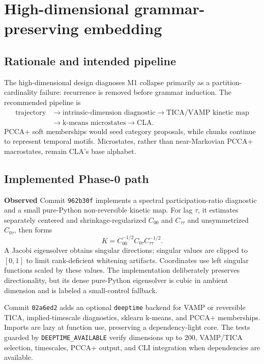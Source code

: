 \documentclass[11pt]{article}
\newcommand{\Observed}{\textbf{Observed}}
\begin{document}
\section{High-dimensional grammar-preserving embedding}
\subsection{Rationale and intended pipeline}
The high-dimensional design diagnoses M1 collapse primarily as a partition-cardinality failure: recurrence is removed before grammar induction. The recommended pipeline is
\begin{align*}
\text{trajectory} &\rightarrow \text{intrinsic-dimension diagnostic}
\rightarrow \text{TICA/VAMP kinetic map} \\
&\rightarrow \text{k-means microstates}\rightarrow\text{CLA}.
\end{align*}
PCCA+ soft memberships would seed category proposals, while chunks continue to represent temporal motifs. Microstates, rather than near-Markovian PCCA+ macrostates, remain CLA's base alphabet.

\subsection{Implemented Phase-0 path}
\Observed{} Commit \texttt{962b30f} implements a spectral participation-ratio diagnostic and a small pure-Python non-reversible kinetic map. For lag $\tau$, it estimates separately centered and shrinkage-regularized $C_{00}$ and $C_{\tau\tau}$ and unsymmetrized $C_{0\tau}$, then forms
\begin{equation}
K=C_{00}^{-1/2}C_{0\tau}C_{\tau\tau}^{-1/2}.
\end{equation}
A Jacobi eigensolver obtains singular directions; singular values are clipped to $[0,1]$ to limit rank-deficient whitening artifacts. Coordinates use left singular functions scaled by these values. The implementation deliberately preserves directionality, but its dense pure-Python eigensolver is cubic in ambient dimension and is labeled a small-control fallback.

Commit \texttt{02a6ed2} adds an optional \texttt{deeptime} backend for VAMP or reversible TICA, implied-timescale diagnostics, sklearn k-means, and PCCA+ memberships. Imports are lazy at function use, preserving a dependency-light core. The tests guarded by \texttt{DEEPTIME\_AVAILABLE} verify dimensions up to 200, VAMP/TICA selection, timescales, PCCA+ output, and CLI integration when dependencies are available.
\end{document}
